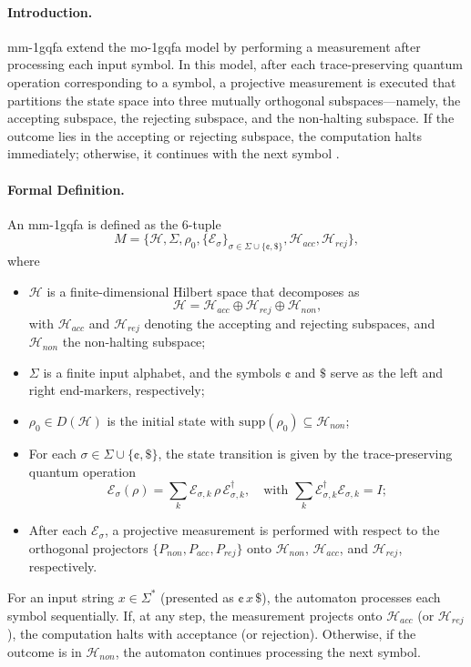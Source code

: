 \paragraph{Introduction.}  
\gls{mm-1gqfa} extend the \gls{mo-1gqfa} model by performing a measurement after processing each input symbol. In this model, after each trace‐preserving quantum operation corresponding to a symbol, a projective measurement is executed that partitions the state space into three mutually orthogonal subspaces—namely, the accepting subspace, the rejecting subspace, and the non‐halting subspace. If the outcome lies in the accepting or rejecting subspace, the computation halts immediately; otherwise, it continues with the next symbol \cite{li2012characterizations}.

\paragraph{Formal Definition.}  
An \gls{mm-1gqfa} is defined as the 6-tuple
\[
M = \{ \mathcal{H},\Sigma,\rho_0,\{\mathcal{E}_\sigma\}_{\sigma\in\Sigma\cup\{\cent,\$\}},\mathcal{H}_{acc},\mathcal{H}_{rej}\},
\]
where
\begin{itemize}
  \item $\mathcal{H}$ is a finite-dimensional Hilbert space that decomposes as
  \[
  \mathcal{H}=\mathcal{H}_{acc}\oplus \mathcal{H}_{rej}\oplus \mathcal{H}_{non},
  \]
  with $\mathcal{H}_{acc}$ and $\mathcal{H}_{rej}$ denoting the accepting and rejecting subspaces, and $\mathcal{H}_{non}$ the non-halting subspace;
  \item $\Sigma$ is a finite input alphabet, and the symbols $\cent$ and $\$$ serve as the left and right end-markers, respectively;
  \item $\rho_0\in D(\mathcal{H})$ is the initial state with $\mathrm{supp}(\rho_0)\subseteq \mathcal{H}_{non}$;
  \item For each $\sigma\in\Sigma\cup\{\cent,\$\}$, the state transition is given by the trace‐preserving quantum operation 
  \[
  \mathcal{E}_\sigma(\rho)=\sum_{k} \mathcal{E}_{\sigma,k}\,\rho\,\mathcal{E}_{\sigma,k}^\dagger,\quad \text{with } \sum_{k} \mathcal{E}_{\sigma,k}^\dagger \mathcal{E}_{\sigma,k}=I;
  \]
  \item After each $\mathcal{E}_\sigma$, a projective measurement is performed with respect to the orthogonal projectors $\{P_{non},P_{acc},P_{rej}\}$ onto $\mathcal{H}_{non}$, $\mathcal{H}_{acc}$, and $\mathcal{H}_{rej}$, respectively.
\end{itemize}
For an input string $x\in\Sigma^*$ (presented as $\cent\,x\,\$$), the automaton processes each symbol sequentially. If, at any step, the measurement projects onto $\mathcal{H}_{acc}$ (or $\mathcal{H}_{rej}$), the computation halts with acceptance (or rejection). Otherwise, if the outcome is in $\mathcal{H}_{non}$, the automaton continues processing the next symbol.

